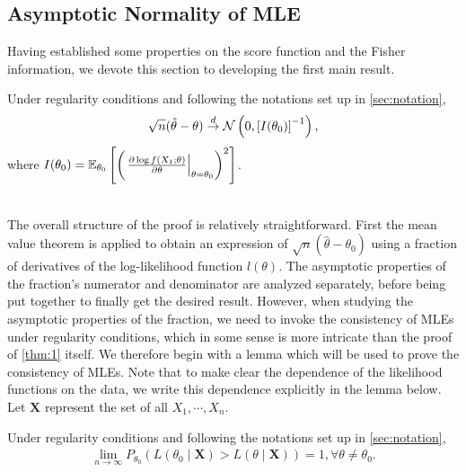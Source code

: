 \subsection{Asymptotic Normality of MLE}
Having established some properties on the score function and the Fisher information, we devote this section to developing the first main result.
\begin{theorem} \label{thm:1}
Under regularity conditions and following the notations set up in \cref{sec:notation}, 
\begin{align*}
\sqrt{n}(\hat{\theta} - \theta) \overset{d}{\rightarrow} \mathcal{N}\left(0, \left[ I(\theta_0) \right]^{-1}\right),
\end{align*}
where $I(\theta_0) = \mathbb{E}_{\theta_0}\left[ \left( \left.\frac{\partial \log f(X_1;\theta)}{\partial\theta}\right\vert_{\theta=\theta_0} \right)^2 \right]$.
\end{theorem}
$ $\\
The overall structure of the proof is relatively straightforward. First the mean value theorem is applied to obtain an expression of $\sqrt{n}(\hat{\theta} - \theta_0)$ using a fraction of derivatives of the log-likelihood function $l(\theta)$. The asymptotic properties of the fraction's numerator and denominator are analyzed separately, before being put together to finally get the desired result. However, when studying the asymptotic properties of the fraction, we need to invoke the consistency of MLEs under regularity conditions, which in some sense is more intricate than the proof of \cref{thm:1} itself. We therefore begin with a lemma which will be used to prove the consistency of MLEs. Note that to make clear the dependence of the likelihood functions on the data, we write this dependence explicitly in the lemma below. Let $\bm{X}$ represent the set of all \iid $X_1,\cdots,X_n$.
\begin{lemma} \label{lem:1}
Under regularity conditions and following the notations set up in \cref{sec:notation},
\begin{align*}
\lim_{n\to\infty} P_{\theta_0}\left( L(\theta_0 \mid \bm{X}) > L(\theta \mid \bm{X}) \right) = 1, \forall \theta \neq \theta_0.
\end{align*}
\end{lemma}
